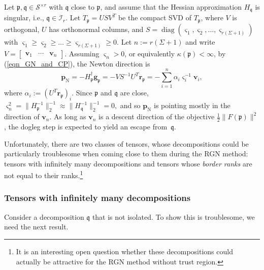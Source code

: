 \documentclass[a4paper,10pt,final]{siamart1116}
\newcommand{\tuple}[1]{\mathfrak{#1}}
\newcommand{\Var}[1]{\mathcal{#1}}
\newcommand{\vect}[1]{\mathbf{#1}}
\newcommand{\refeqn}[1]{{(\ref{#1})}}
\numberwithin{equation}{section}
\numberwithin{figure}{section}
\numberwithin{table}{section}
\numberwithin{theorem}{section}
\begin{document}
Let $\tuple{p}, \tuple{q} \in \Var{S}^{\times r}$ with $\tuple{q}$ close to $\tuple{p}$, and assume that the Hessian approximation $H_{\tuple{q}}$ is singular, i.e., $\tuple{q} \in \Var{I}_r$.
Let $T_{\tuple{p}} = U S V^T$ be the compact SVD of $T_{\tuple{p}}$, where $V$ is orthogonal, $U$ has orthonormal columns, and $S = \operatorname{diag}(\varsigma_1, \varsigma_2, \ldots, \varsigma_{r(\Sigma+1)})$ with $\varsigma_1 \ge \varsigma_2 \ge \ldots \ge \varsigma_{r(\Sigma+1)} \ge 0$. Let $n := r(\Sigma+1)$ and write
\(
V=\begin{bmatrix}\vect{v}_1 & \cdots & \vect{v}_n \end{bmatrix}
\). Assuming $\varsigma_{n} > 0$, or equivalently $\kappa(\tuple{p}) < \infty$, by \refeqn{eqn_GN_and_CP}, the Newton direction is
\begin{equation}\label{alpha_i}
\vect{p}_{\mathrm{N}} = -H_{\tuple{p}}^\dagger \vect{g}_{\tuple{p}} = - V S^{-1} U^T \vect{r}_{\tuple{p}} = -\sum_{i=1}^{n} \alpha_i \varsigma_i^{-1} \vect{v}_i,
\end{equation}
where $\alpha_i := (U^T\vect{r}_{\tuple{p}})_i$. Since $\tuple{p}$ and $\tuple{q}$ are close,
$
\varsigma_n^2 = \|H_{\tuple{p}}^{-1}\|_2^{-1} \approx \|H_{\tuple{q}}^{-1}\|_2^{-1} = 0,
$
and so $\vect{p}_{\mathrm{N}}$ is pointing mostly in the direction of $\vect{v}_{n}$. As long as $\vect{v}_n$ is a descent direction of the objective $\tfrac{1}{2}\|F(\tuple{p})\|^2$, the dogleg step is expected to yield an escape from~$\tuple{q}$.

Unfortunately, there are two classes of tensors, whose decompositions could be particularly troublesome when coming close to them during the RGN method: tensors with infinitely many decompositions and tensors whose \emph{border ranks} \cite[section 2.4]{Landsberg2012} are not equal to their ranks.\footnote{It is an interesting open question whether these decompositions could actually be attractive for the RGN method without trust region.}

\subsubsection{Tensors with infinitely many decompositions}
Consider a decomposition $\tuple{q}$ that is not isolated. To show this is troublesome, we need the next result.
\end{document}
